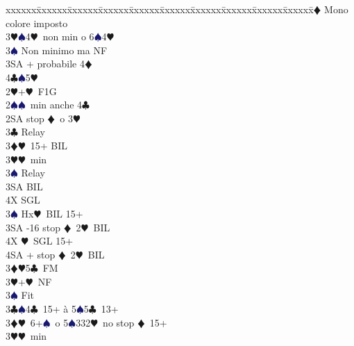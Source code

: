 \documentclass[a4paper,italian]{article}
\newcommand{\BC}{\textcolor{OliveGreen}{$\clubsuit$}}
\newcommand{\BD}{\textcolor{RedOrange}{$\vardiamondsuit$}}
\newcommand{\BH}{\textcolor{Red2}{$\varheartsuit${}}}
\newcommand{\BS}{\textcolor{MidnightBlue}{$\spadesuit${}}}
\newenvironment{bidtable}
{\begin{tabbing}

    xxxxxx\=xxxxxx\=xxxxxx\=xxxxxx\=xxxxxx\=xxxxxx\=xxxxxx\=xxxxxx\=xxxxxx\=xxxxxx\=\kill}
{\end{tabbing} }%
\begin{document}
\begin{multicols}{2}
\begin{bidtable}
                                            3\BD \> Mono colore imposto\\
                                            3\BH {}\BS 4\BH\ non min o 6\BS 4\BH \\
                                            3\BS \> Non minimo ma NF\\
                                            3SA + probabile 4\BD \\
                                            4\BC {}\BS 5\BH \-\\
                                            2\BH {}+\BH\ F1G\+\\
                                            2\BS {}\BS\ min anche 4\BC \\
                                            2SA  stop \BD\ o 3\BH \+\\
                                            3\BC \> Relay\+\\
                                            3\BD {}\BH\ 15+ BIL\\
                                            3\BH {}\BH\ min\+\\
                                            3\BS \> Relay\+\\
                                            3SA \> BIL\\
                                            4X \> SGL\-\-\\
                                            3\BS \> Hx\BH\ BIL 15+\\
                                            3SA -16 stop \BD\ 2\BH\ BIL\\
                                            4X \BH\ SGL 15+\\
                                            4SA + stop \BD\ 2\BH\ BIL\-\\
                                            3\BD {}\BH 5\BC\ FM\\
                                            3\BH {}+\BH\ NF\\
                                            3\BS \> Fit\-\\
                                            3\BC {}\BS 4\BC\ 15+ à 5\BS 5\BC\ 13+\\
                                            3\BD {}\BH\ 6+\BS\ o 5\BS 332\BH\ no stop \BD\ 15+\\
                                            3\BH {}\BH\ min\+\\

\end{bidtable}
\end{multicols}
\end{document}
